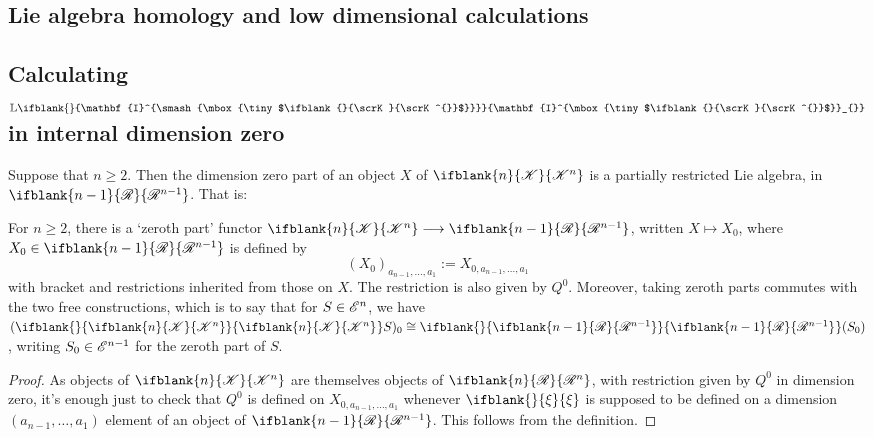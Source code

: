 \documentclass[10pt]{article}
\newcommand{\GS}[1]{\scrE^{#1}}
\newcommand{\PRLie}[1]%
{\ifblank{#1}{\scrR}{\scrR^{#1}}}
\newcommand{\LL}[1]{\ifblank{#1}{\scrK}{\scrK^{#1}}}
\newcommand{\Ind}[2][]{\ifblank{#1}{\mathbf{I}^{\smash{\mbox{\tiny $#2$}}}}{\mathbf{I}^{\mbox{\tiny $#2$}}_{#1}}}%
\newcommand{\Fr}[2][]{\ifblank{#1}{#2}{#2_{#1}}}
\newcommand{\restn}[2][]{\ifblank{#1}{\xi{#2}}{\xi_{#1}{#2}}}%
\newcommand{\derived}{\mathbb{L}}
\renewcommand{\Q}{Q}
\begin{document}
\begin{DerivedFunctorsLowDimension}
\section{Lie algebra homology and low dimensional calculations}
\subsection{Calculating $\derived\Ind{\LL{}}$ in internal dimension zero}
Suppose that $n\geq2$. Then the dimension zero part of an object $X$ of $\LL{n}$ is a partially restricted Lie algebra, in $\PRLie{n-1}$. That is: 
\begin{lem}
For $n\geq2$, there is a `zeroth part' functor $\LL{n}\to\PRLie{n-1}$, written $X\mapsto X_0$, where $X_0\in\PRLie{n-1}$ is defined by
\[(X_0)_{a_{n-1},\ldots,a_1}:=X_{0,a_{n-1},\ldots,a_1}\]
with bracket and restrictions inherited from those on $X$. The restriction is also given by $\Q^0$. Moreover, taking zeroth parts commutes with the two free constructions, which is to say that for $S\in\GS{n}$, we have $(\Fr{\LL{n}}S)_0\cong\Fr{\PRLie{n-1}}(S_0)$, writing $S_0\in\GS{n-1}$ for the zeroth part of $S$.
\end{lem}
\begin{proof}
As objects of $\LL{n}$ are themselves objects of $\PRLie{n}$, with restriction given by $\Q^0$ in dimension zero, it's enough just to check that $\Q^0$ is defined on $X_{0,a_{n-1},\ldots,a_1}$ whenever $\restn{}$ is supposed to be defined on a dimension $(a_{n-1},\ldots,a_1)$ element of an object of $\PRLie{n-1}$. This follows from the definition.


\end{proof}
\end{DerivedFunctorsLowDimension}
\end{document}
